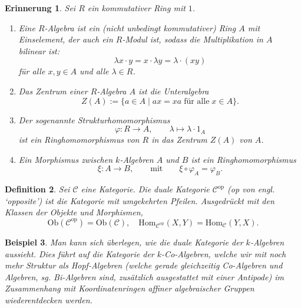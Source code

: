 \documentclass[a4paper, 11pt]{scrartcl}
\newcommand{\Hom}{\text{Hom}}
\newcommand{\Ob}{\text{Ob}}
\theoremstyle{basicstyle}
\newtheorem{definition}{Definition}[section]
\newtheorem{beispiel}[definition]{Beispiel}
\newtheorem{erinnerung}[definition]{Erinnerung}
\begin{document}
    \begin{erinnerung}
        Sei \(R\) ein kommutativer Ring mit \(1\).
        \begin{enumerate}
            \item Eine \emph{\(R\)-Algebra} ist ein (nicht unbedingt kommutativer) Ring \(A\) mit Einselement, der auch ein \(R\)-Modul ist, sodass die Multiplikation in \(A\) bilinear ist:
                \[\lambda x \cdot y = x \cdot \lambda y = \lambda \cdot (xy)\]
                für alle \(x,y \in A\) und alle \(\lambda \in R\).

            \item Das \emph{Zentrum} einer \(R\)-Algebra \(A\) ist die Unteralgebra
                \[Z(A) := \{a \in A \;\vert\; ax = xa \; \text{für alle} \; x \in A\}.\]

            \item Der sogenannte \emph{Strukturhomomorphismus} 
                \[\varphi: R \longrightarrow A, \qquad \lambda \mapsto \lambda \cdot 1_A\]
                ist ein Ringhomomorphismus von \(R\) in das Zentrum \(Z(A)\) von \(A\).

            \item Ein Morphismus zwischen \(k\)-Algebren \(A\) und \(B\) ist ein Ringhomomorphismus
                \[\xi: A \longrightarrow B, \qquad\text{mit}\qquad \xi \circ \varphi_A = \varphi_B.\]
        \end{enumerate}
    \end{erinnerung}

    \begin{definition}
        Sei \(\mathcal{C}\) eine Kategorie.
        Die \emph{duale Kategorie} \(\mathcal{C}^{\text{op}}\) (op von engl. `opposite') ist die Kategorie mit umgekehrten Pfeilen.
        Ausgedrückt mit den Klassen der Objekte und Morphismen,
        \[\Ob(\mathcal{C}^{\text{op}}) = \Ob(\mathcal{C}), \quad \Hom_{\mathcal{C}^{\text{op}}}(X, Y) = \Hom_{\mathcal{C}}(Y, X).\]
    \end{definition}

    \begin{beispiel}
        Man kann sich überlegen, wie die duale Kategorie der \(k\)-Algebren aussieht.
        Dies führt auf die Kategorie der \(k\)-Co-Algebren, welche wir mit noch mehr Struktur als Hopf-Algebren (welche gerade gleichzeitig Co-Algebren und Algebren, sg. Bi-Algebren sind, zusätzlich ausgestattet mit einer Antipode) im Zusammenhang mit Koordinatenringen affiner algebraischer Gruppen wiederentdecken werden.
    \end{beispiel}
\end{document}
